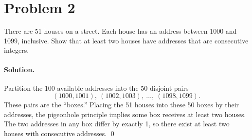\section*{Problem 2}
There are 51 houses on a street. Each house has an address between 1000 and 1099, inclusive. Show that at least two houses have addresses that are consecutive integers.

\paragraph{Solution.}
Partition the 100 available addresses into the 50 disjoint pairs
\[
(1000,1001),\ (1002,1003),\ \dots,\ (1098,1099).
\]
These pairs are the ``boxes.'' Placing the 51 houses into these 50 boxes by their addresses, the pigeonhole principle implies some box receives at least two houses. The two addresses in any box differ by exactly 1, so there exist at least two houses with consecutive addresses. \qed
